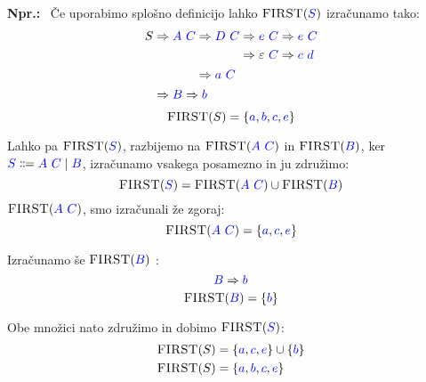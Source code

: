 \documentclass{article}
\newcommand{\Ex}{\textbf{Npr.:}\ }
\newcommand{\FIRST}{\textsc{FIRST}}
\newcommand{\Symbol}[1]{\textcolor{blue}{#1}}
\newcommand{\Null}{\varepsilon}
\newcommand{\Arrow}{\Coloneqq}
\newcommand{\Derive}{\Rightarrow}
\newcommand{\Seq}{\ }
\newcommand{\Union}{\mathrel{|}}
\begin{document}
\Ex
Če uporabimo splošno definicijo lahko $\FIRST(\Symbol{S})$ izračunamo tako:
\begin{equation*}
  S \begin{aligned}[t]
    &\Derive \Symbol{A} \Seq \Symbol{C} \begin{aligned}[t]
      &\Derive \Symbol{D} \Seq \Symbol{C} \begin{aligned}[t]
        &\Derive \Symbol{e} \Seq \Symbol{C} \Derive \Symbol{e} \Seq \Symbol{C} \\
        &\Derive \Null \Seq \Symbol{C} \Derive \Symbol{c} \Seq \Symbol{d} \\
      \end{aligned}\\
      &\Derive \Symbol{a} \Seq \Symbol{C}
    \end{aligned}\\
    &\Derive \Symbol{B} \Derive \Symbol{b}
  \end{aligned}
\end{equation*}
\begin{equation*}
  \FIRST(S) = \{\Symbol{a}, \Symbol{b}, \Symbol{c}, \Symbol{e}\}
\end{equation*}

Lahko pa $\FIRST(\Symbol{S})$, razbijemo na $\FIRST(\Symbol{A} \Seq \Symbol{C})$ in $\FIRST(\Symbol{B})$, ker $\Symbol{S} \Arrow \Symbol{A} \Seq \Symbol{C} \Union \Symbol{B}$, izračunamo vsakega posamezno in ju združimo:
\begin{equation*}
  \FIRST(\Symbol{S}) = \FIRST(\Symbol{A} \Seq \Symbol{C}) \cup \FIRST(\Symbol{B})
\end{equation*}
$\FIRST(\Symbol{A} \Seq \Symbol{C})$, smo izračunali že zgoraj:
\begin{equation*}
  \FIRST(\Symbol{A} \Seq \Symbol{C}) = \{\Symbol{a}, \Symbol{c}, \Symbol{e}\}
\end{equation*}

Izračunamo še $\FIRST(\Symbol{B})$ :
\begin{equation*}
  \Symbol{B} \Derive \Symbol{b}
\end{equation*}
\begin{equation*}
  \FIRST(\Symbol{B}) = \{\Symbol{b}\}
\end{equation*}

Obe množici nato združimo in dobimo $\FIRST(\Symbol{S})$:
\begin{align*}
  \FIRST(S) &= \{\Symbol{a}, \Symbol{c}, \Symbol{e}\} \cup \{\Symbol{b}\}\\
  \FIRST(S) &= \{\Symbol{a}, \Symbol{b}, \Symbol{c}, \Symbol{e}\}
\end{align*}
\end{document}
